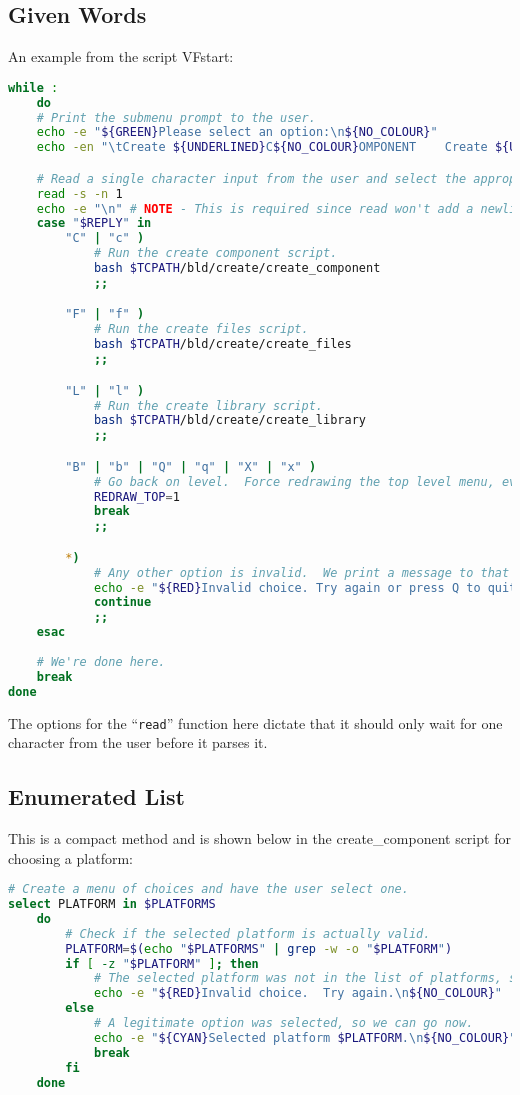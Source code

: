 \documentclass[a4paper, oneside, 11pt, titlepage, onecolumn, openright]{report}
\begin{document}
\subsection{Given Words}
			\label{ss:GivenWords}
			An example from the script VFstart:
			
\begin{lstlisting}[frame=trBL, breaklines=true, language = bash]
while :
	do
	# Print the submenu prompt to the user.
	echo -e "${GREEN}Please select an option:\n${NO_COLOUR}"
	echo -en "\tCreate ${UNDERLINED}C${NO_COLOUR}OMPONENT    Create ${UNDERLINED}F${NO_COLOUR}ILES    Create ${UNDERLINED}L${NO_COLOUR}IBRARY    ${UNDERLINED}B${NO_COLOUR}ACK"

	# Read a single character input from the user and select the appropriate response.
	read -s -n 1
	echo -e "\n" # NOTE - This is required since read won't add a newline after reading a single character.
	case "$REPLY" in
		"C" | "c" )
			# Run the create component script.
			bash $TCPATH/bld/create/create_component
			;;

		"F" | "f" )
			# Run the create files script.
			bash $TCPATH/bld/create/create_files
			;;

		"L" | "l" )
			# Run the create library script.
			bash $TCPATH/bld/create/create_library
			;;

		"B" | "b" | "Q" | "q" | "X" | "x" )
			# Go back on level.  Force redrawing the top level menu, even if we aren't in block mode.
			REDRAW_TOP=1
			break
			;;

		*)
			# Any other option is invalid.  We print a message to that effect and try again.
			echo -e "${RED}Invalid choice. Try again or press Q to quit.\n${NO_COLOUR}"
			continue
			;;
	esac
				
	# We're done here.
	break
done		        
\end{lstlisting}

				The options for the ``\texttt{read}'' function here dictate that it should only wait for one character from the user before it parses it.

\subsection{Enumerated List}
			\label{ss:EnumeratedList}	
				This is a compact method and is shown below in the create\_component script for choosing a platform:
				
\begin{lstlisting}[frame=trBL, breaklines=true, language = bash]				
# Create a menu of choices and have the user select one.
select PLATFORM in $PLATFORMS
	do
		# Check if the selected platform is actually valid.
		PLATFORM=$(echo "$PLATFORMS" | grep -w -o "$PLATFORM")
		if [ -z "$PLATFORM" ]; then
			# The selected platform was not in the list of platforms, so the user is apparently a moron.
			echo -e "${RED}Invalid choice.  Try again.\n${NO_COLOUR}"
		else
			# A legitimate option was selected, so we can go now.
			echo -e "${CYAN}Selected platform $PLATFORM.\n${NO_COLOUR}"
			break
		fi
	done				
\end{lstlisting}			
\end{document}
